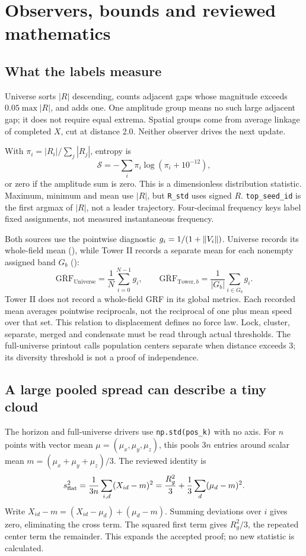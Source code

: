 \section{Observers, bounds and reviewed mathematics}\label{sec:observers}
\subsection{What the labels measure}
Universe sorts \(|R|\) descending, counts adjacent gaps whose magnitude exceeds \(0.05\max|R|\), and adds one. One amplitude group means no such large adjacent gap; it does not require equal extrema. Spatial groups come from average linkage of completed \(X\), cut at distance 2.0. Neither observer drives the next update.

With \(\pi_i=|R_i|/\sum_j|R_j|\), entropy is
\begin{equation}
\mathcal S=-\sum_i\pi_i\log(\pi_i+10^{-12}),
\end{equation}
or zero if the amplitude sum is zero. This is a dimensionless distribution statistic. Maximum, minimum and mean use \(|R|\), but \texttt{R\_std} uses signed \(R\). \texttt{top\_seed\_id} is the first argmax of \(|R|\), not a leader trajectory. Four-decimal frequency keys label fixed assignments, not measured instantaneous frequency.

Both sources use the pointwise diagnostic \(g_i=1/(1+\left\lVert V_i\right\rVert)\). Universe records its whole-field mean (), while Tower II records a separate mean for each nonempty assigned band \(G_b\) ():
\begin{equation}\label{eq:grf}
\overline{\mathrm{GRF}}_{\mathrm{Universe}}=\frac1N\sum_{i=0}^{N-1}g_i,
\qquad \overline{\mathrm{GRF}}_{\mathrm{Tower},b}=\frac1{|G_b|}\sum_{i\in G_b}g_i.
\end{equation}
Tower II does not record a whole-field GRF in its global metrics. Each recorded mean averages pointwise reciprocals, not the reciprocal of one plus mean speed over that set. This relation to displacement defines no force law. Lock, cluster, separate, merged and condensate must be read through actual thresholds. The full-universe printout calls population centers separate when distance exceeds 3; its diversity threshold is not a proof of independence.

\subsection{A large pooled spread can describe a tiny cloud}\label{sec:pooled}
The horizon and full-universe drivers use \texttt{np.std(pos\_k)} with no axis. For \(n\) points with vector mean \(\mu=(\mu_x,\mu_y,\mu_z)\), this pools \(3n\) entries around scalar mean \(m=(\mu_x+\mu_y+\mu_z)/3\). The reviewed identity is
\begin{equation}\label{eq:pooled}
s_{\rm flat}^2=\frac1{3n}\sum_{i,d}(X_{id}-m)^2
=\frac{R_g^2}{3}+\frac13\sum_d(\mu_d-m)^2.
\end{equation}
Write \(X_{id}-m=(X_{id}-\mu_d)+(\mu_d-m)\). Summing deviations over \(i\) gives zero, eliminating the cross term. The squared first term gives \(R_g^2/3\), the repeated center term the remainder. This expands the accepted proof; no new statistic is calculated.

